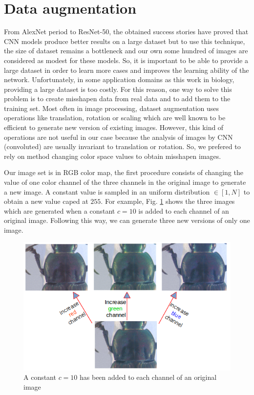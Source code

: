 \documentclass[review]{elsarticle}
\begin{document}
\section{Data augmentation}
\label{Sdataaug}
From AlexNet period to ResNet-50, the obtained success stories \cite{krizhevsky2012imagenet,he2016deep} have proved that CNN models produce better results on a large dataset but to use this technique, the size of dataset remains a bottleneck and our own some hundred of images are considered as modest for these models. So, it is important to be able to provide a large dataset in order to learn more cases and improves the learning ability of the network. Unfortunately, in some application domains as this work in biology, providing a large dataset is too costly. For this reason, one way to solve this problem is to create misshapen data from real data and to add them to the training set. Most often in image processing, dataset augmentation uses operations like translation, rotation or scaling which are well known to be efficient to generate new version of existing images. However, this kind of operations are not useful in our case because the analysis of images by CNN (convoluted) are usually invariant to translation or rotation. So, we prefered to rely on method changing color space values to obtain misshapen images.

Our image set is in RGB color map, the first procedure consists of changing the value of one color channel of the three channels in the original image to generate a new image. A constant value is sampled in an uniform distribution $\in [1, N]$ to obtain a new value caped at $255$. For example, Fig. \ref{figaug1} shows the three images which are generated  when a constant $c = 10$ is added to each channel of an original image. Following this way, we can generate three new versions of only one image.

\begin{figure}[h]
	\centering
	\includegraphics[scale=0.4]{images/inc_channels}
	\caption{A constant $c = 10$ has been added to each channel of an original image}
	\label{figaug1}
\end{figure}
\end{document}
